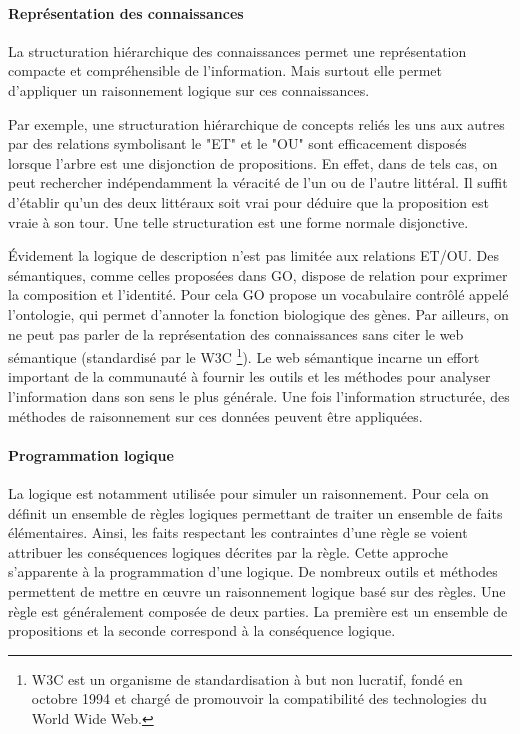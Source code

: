\begin{refsegment}
    \paragraph{Représentation des connaissances}
    La structuration hiérarchique des connaissances permet une représentation compacte et compréhensible de l'information. Mais surtout elle permet d'appliquer un raisonnement logique sur ces connaissances.
    
    Par exemple, une structuration hiérarchique de concepts reliés les uns aux autres par des relations symbolisant le "ET" et le "OU" sont efficacement disposés lorsque l'arbre est une disjonction de propositions. En effet, dans de tels cas, on peut rechercher indépendamment la véracité de l'un ou de l'autre littéral. Il suffit d'établir qu'un des deux littéraux soit vrai pour déduire que la proposition est vraie à son tour. Une telle structuration est une forme normale disjonctive.   
    
    
    Évidement la logique de description n'est pas limitée aux relations ET/OU. Des sémantiques, comme celles proposées dans \acrfull{GO}, dispose de relation pour exprimer la composition et l'identité. Pour cela  \acrfull{GO} propose un vocabulaire contrôlé appelé l'ontologie, qui permet d’annoter la fonction biologique des gènes. Par ailleurs, on ne peut pas parler de la représentation des connaissances sans citer le web sémantique (standardisé par le W3C \footnote{W3C est un organisme de standardisation à but non lucratif, fondé en octobre 1994 et chargé de promouvoir la compatibilité des technologies du World Wide Web.}). Le web sémantique incarne un effort important de la communauté à fournir les outils et les méthodes pour analyser l'information dans son sens le plus générale. Une fois l'information structurée, des méthodes de raisonnement sur ces données peuvent être appliquées.
    
    \paragraph{Programmation logique}
    La logique est notamment utilisée pour simuler un raisonnement. Pour cela on définit un ensemble de règles logiques permettant de traiter un ensemble de faits élémentaires. Ainsi, les faits respectant les contraintes d'une règle se voient attribuer les conséquences logiques décrites par la règle. Cette approche s'apparente à la programmation d'une logique. De nombreux outils et méthodes permettent de mettre en œuvre un raisonnement logique basé sur des règles. Une règle est généralement composée de deux parties. La première est un ensemble de propositions et la seconde correspond à la conséquence logique.
    

\end{refsegment}
